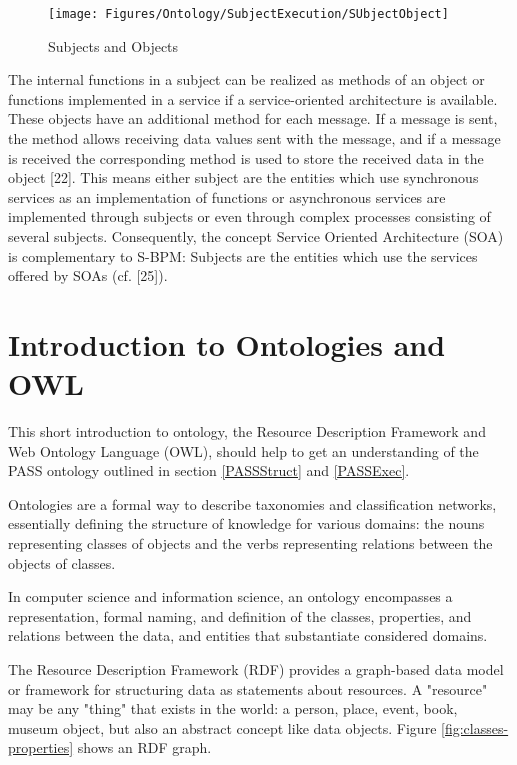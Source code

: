 \begin{figure}[htbp]
	\centering
	\texttt{[image: Figures/Ontology/SubjectExecution/SUbjectObject]}
	\label{fig:subjectobject}
	\caption[Subjects and Objects]{Subjects and Objects}
\end{figure}

The internal functions in a subject can be realized as methods of an object or functions implemented in a service if a service-oriented architecture is available. These objects have an additional method for each message. If a message is sent, the method allows receiving data values sent with the message, and if a message is received the corresponding method is used to store the received data in the object [22]. This means either subject are the entities which use synchronous services as an implementation of functions or asynchronous services are implemented through subjects or even through complex processes consisting of several subjects. Consequently, the concept Service Oriented Architecture (SOA) is complementary to S-BPM: Subjects are the entities which use the services offered by SOAs (cf. [25]).

\section{Introduction to Ontologies and OWL }
\label{IntroOntology}

This short introduction to ontology, the Resource Description Framework and Web Ontology Language (OWL), should help to get an understanding of the PASS ontology outlined in section \ref{PASSStruct} and \ref{PASSExec}.

Ontologies are a formal way to describe taxonomies and classification networks, essentially defining the structure of knowledge for various domains: the nouns representing classes of objects and the verbs representing relations between the objects of classes.

In computer science and information science, an ontology encompasses a representation, formal naming, and definition of the classes, properties, and relations between the data, and entities that substantiate considered domains.

The Resource Description Framework (RDF) provides a graph-based data model or framework for structuring data as statements about resources. A "resource" may be any "thing" that exists in the world: a person, place, event, book, museum object, but also an abstract concept like data objects. Figure \ref{fig:classes-properties}  shows an RDF graph.

